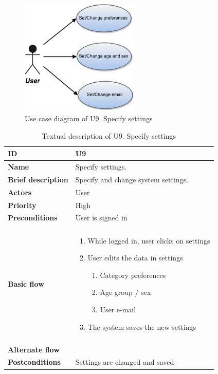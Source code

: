 \begin{figure}[htp]
	\includegraphics[width=0.5\textwidth]{fig/U9}
	\centering
	\caption{Use case diagram of U9. Specify settings}
	\label{Fig:U9}
\end{figure}

\begin{table}[htp]
	\centering
	\caption{Textual description of U9. Specify settings}
	\begin{tabular}[b]{|l | l|}\hline
		\textbf{ID} 				& U9									\\\hline
		\textbf{Name} 				& Specify settings.						\\\hline
		\textbf{Brief description}	& Specify and change system settings. 	\\\hline
		\textbf{Actors} 			& User									\\\hline
		\textbf{Priority}			& High									\\\hline
		\textbf{Preconditions}		& User is signed in						\\\hline&\\[-2ex]
		\textbf{Basic flow}			& \begin{minipage}{5in}
			\begin{enumerate}[noitemsep]
				\item While logged in, user clicks on settings
				\item User edits the data in settings
					\begin{enumerate}
						\item Category preferences
						\item Age group / sex
						\item User e-mail
					\end{enumerate}
				\item The system saves the new settings
			\end{enumerate}						
		\end{minipage}						\\\hline&\\[-2ex]
		\textbf{Alternate flow}		& \begin{minipage}{5in}
		\end{minipage}							\\\hline
		\textbf{Postconditions}		& Settings are changed and saved\\\hline
	\end{tabular}
	\label{Tab:U9}
\end{table}

